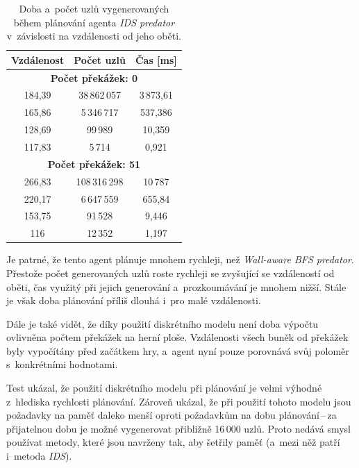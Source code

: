 \begin{table}[ht]
    \centering
    \begin{tabular}{|c|c|c|} \hline
        \textbf{Vzdálenost} & \textbf{Počet uzlů} & \textbf{Čas [ms]} \\ \hline\hline
        \multicolumn{3}{|c|}{\textbf{Počet překážek: 0}}              \\ \hline
        184,39              & 38\,862\,057        & 3\,873,61         \\ \hline
        165,86              & 5\,346\,717         & 537,386           \\ \hline
        128,69              & 99\,989             & 10,359            \\ \hline
        117,83              & 5\,714              & 0,921             \\ \hline\hline
        \multicolumn{3}{|c|}{\textbf{Počet překážek: 51}}             \\ \hline
        266,83              & 108\,316\,298       & 10\,787           \\ \hline
        220,17              & 6\,647\,559         & 655,84            \\ \hline
        153,75              & 91\,528             & 9,446             \\ \hline
        116                 & 12\,352             & 1,197             \\ \hline
    \end{tabular}
    \caption{Doba a~počet uzlů vygenerovaných během plánování agenta \emph{IDS predator} v~závislosti na vzdálenosti od jeho oběti.}
    \label{tab:benchmark-ids-predator}
\end{table}

Je patrné, že tento agent plánuje mnohem rychleji, než \emph{Wall-aware BFS predator}. Přestože počet generovaných uzlů roste rychleji se zvyšující se vzdáleností od oběti, čas využitý při jejich generování a~prozkoumávání je mnohem nižší. Stále je však doba plánování příliš dlouhá i~pro malé vzdálenosti.

Dále je také vidět, že díky použití diskrétního modelu není doba výpočtu ovlivněna počtem překážek na herní ploše. Vzdálenosti všech buněk od překážek byly vypočítány před začátkem hry, a~agent nyní pouze porovnává svůj poloměr s~konkrétními hodnotami.

Test ukázal, že použití diskrétního modelu při plánování je velmi výhodné z~hlediska rychlosti plánování. Zároveň ukázal, že při použití tohoto modelu jsou požadavky na paměť daleko menší oproti požadavkům na dobu plánování\,--\,za přijatelnou dobu je možné vygenerovat přibližně 16\,000 uzlů. Proto nedává smysl používat metody, které jsou navrženy tak, aby šetřily paměť (a~mezi něž patří i~metoda \emph{IDS}).


